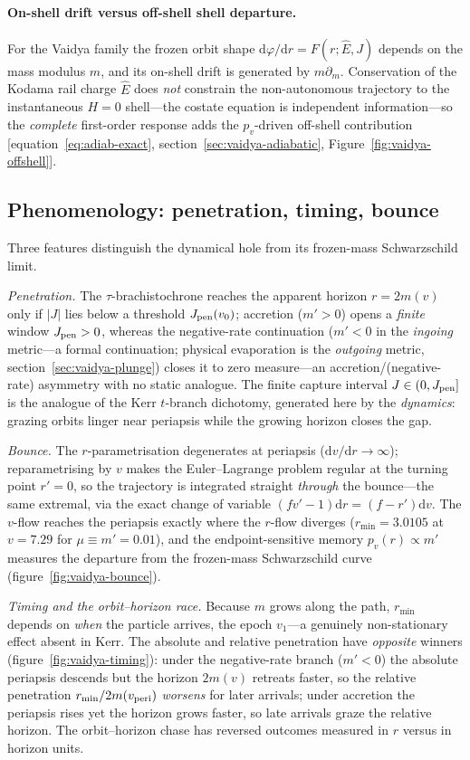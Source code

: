 \documentclass[12pt]{iopart}
\newcommand{\Ehat}{\hat E}
\newcommand{\Jpen}{J_{\rm pen}}
\newcommand{\dd}{\mathrm{d}}
\theoremstyle{plain}
\theoremstyle{definition}
\theoremstyle{plain}
\theoremstyle{remark}
\begin{document}
\paragraph{On-shell drift versus off-shell shell departure.} For the Vaidya family the frozen orbit shape
$\mathrm{d}\varphi/\mathrm{d}r=F(r;\Ehat,J)$ depends on the mass modulus $m$, and its
on-shell drift is generated by $m\partial_m$. Conservation of the Kodama rail charge
$\Ehat$ does \emph{not} constrain the non-autonomous trajectory to the instantaneous
$H=0$ shell---the costate equation is independent information---so the \emph{complete}
first-order response adds the $p_v$-driven off-shell contribution
[equation~\eqref{eq:adiab-exact}, section~\ref{sec:vaidya-adiabatic},
Figure~\ref{fig:vaidya-offshell}].


\subsection{Phenomenology: penetration, timing, bounce}
\label{sec:vaidya-pheno}
Three features distinguish the dynamical hole from its frozen-mass
Schwarzschild limit.

\emph{Penetration.} The $\tau$-brachistochrone reaches the apparent horizon
$r=2m(v)$ only if $|J|$ lies below a threshold $\Jpen(v_0)$; accretion ($m'>0$)
opens a \emph{finite} window $\Jpen>0$, whereas the negative-rate continuation
($m'<0$ in the \emph{ingoing} metric---a formal continuation; physical evaporation is
the \emph{outgoing} metric, section~\ref{sec:vaidya-plunge}) closes it to zero
measure---an accretion/(negative-rate) asymmetry with no static analogue. The
finite capture interval $J\in(0,\Jpen]$ is the analogue of the Kerr $t$-branch
dichotomy, generated here by the \emph{dynamics}: grazing orbits linger near
periapsis while the growing horizon closes the gap.

\emph{Bounce.} The $r$-parametrisation degenerates at periapsis
($\dd v/\dd r\to\infty$); reparametrising by $v$ makes the Euler--Lagrange
problem regular at the turning point $r'=0$, so the trajectory is integrated
straight \emph{through} the bounce---the same extremal, via the exact change of
variable $(f v'-1)\dd r=(f-r')\dd v$. The $v$-flow reaches the periapsis exactly
where the $r$-flow diverges ($r_{\min}=3.0105$ at $v=7.29$ for $\mu\equiv m'=0.01$),
and the endpoint-sensitive memory $p_v(r)\propto m'$ measures the departure from the
frozen-mass Schwarzschild curve (figure~\ref{fig:vaidya-bounce}).

\emph{Timing and the orbit--horizon race.} Because $m$ grows along the path,
$r_{\min}$ depends on \emph{when} the particle arrives, the epoch $v_1$---a
genuinely non-stationary effect absent in Kerr. The absolute and
relative penetration have \emph{opposite} winners
(figure~\ref{fig:vaidya-timing}): under the negative-rate branch ($m'<0$) the absolute
periapsis descends but the horizon $2m(v)$ retreats faster, so the relative penetration
$r_{\min}/2m(v_{\rm peri})$ \emph{worsens} for later arrivals; under accretion the
periapsis rises yet the horizon grows faster, so late arrivals graze the relative
horizon. The orbit--horizon chase has reversed outcomes measured in $r$ versus in
horizon units.
\end{document}
